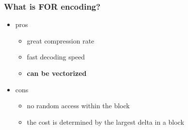 \documentclass{beamer}
\begin{document}
  	\begin{frame}
  		\frametitle{What is FOR encoding?}
  		\begin{itemize}
    		    \item pros
    		    \begin{itemize}
    		    		\item great compression rate %
    		    		\item fast decoding speed
    		    		\item \textbf{can be vectorized}
    		    \end{itemize}
    		    \item cons
    		    \begin{itemize}
    		    		\item no random access within the block
    		    		\item the cost is determined by the largest delta in a block
    		    \end{itemize}
		\end{itemize}  		
  	\end{frame}
\end{document}
